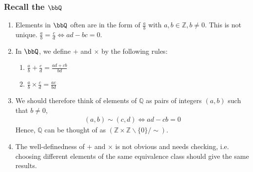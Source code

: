 \documentclass{article}
\begin{document}
\subsubsection{Recall the $\bbQ$}
\begin{enumerate}
    \item Elements in $\bbQ$ often are in the form of $\frac{a}{b}$ with $a, b \in \mathbb{Z}, b \neq 0$. This is not unique. $\frac{a}{b}=\frac{c}{d} \Longleftrightarrow a d-b c=0$.
    \item In $\bbQ$, we define $+$ and $\times$ by the following rules:
    \begin{enumerate}
        \item $\frac{a}{b}+\frac{c}{d}=\frac{a d+c b}{b d}$
        \item $\frac{a}{b} \times \frac{c}{d}=\frac{a c}{b d}$
    \end{enumerate}
\item We should therefore think of elements of $\mathbb{Q}$ as pairs of integers $(a, b)$ such that $b \neq 0$, 
\begin{align*}
(a, b) \sim(c, d) \Longleftrightarrow a d-c b=0
\end{align*}
Hence, $\mathbb{Q}$ can be thought of as $(\mathbb{Z} \times \mathbb{Z} \backslash\{0\} / \sim)$. 
\item The well-definedness of $+$ and $\times$ is not obvious and needs checking, i.e. choosing different elements of the same equivalence class should give the same results.
\end{enumerate}
\end{document}
